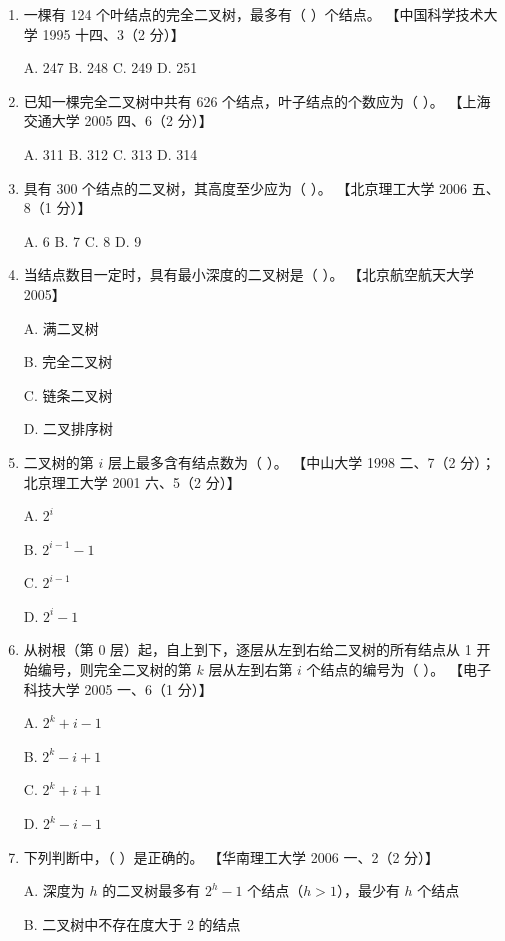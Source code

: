 \documentclass[lang=cn,newtx,10pt,scheme=chinese]{elegantbook}
\begin{document}
\begin{enumerate}
    \item 一棵有 124 个叶结点的完全二叉树，最多有（ ）个结点。  
    【中国科学技术大学 1995 十四、3（2 分）】  

    A. 247 \quad B. 248 \quad C. 249 \quad D. 251  

    \item 已知一棵完全二叉树中共有 626 个结点，叶子结点的个数应为（ ）。  
    【上海交通大学 2005 四、6（2 分）】  

    A. 311 \quad B. 312 \quad C. 313 \quad D. 314  

    \item 具有 300 个结点的二叉树，其高度至少应为（ ）。  
    【北京理工大学 2006 五、8（1 分）】  

    A. 6 \quad B. 7 \quad C. 8 \quad D. 9  

    \item 当结点数目一定时，具有最小深度的二叉树是（ ）。  
    【北京航空航天大学 2005】  

    A. 满二叉树  

    B. 完全二叉树  

    C. 链条二叉树  

    D. 二叉排序树  

    \item 二叉树的第 $i$ 层上最多含有结点数为（ ）。  
    【中山大学 1998 二、7（2 分）；北京理工大学 2001 六、5（2 分）】  

    A. $2^i$  


    B. $2^{i-1} - 1$  

    C. $2^{i-1}$  

    D. $2^{i} - 1$  

    \item 从树根（第 0 层）起，自上到下，逐层从左到右给二叉树的所有结点从 1 开始编号，则完全二叉树的第 $k$ 层从左到右第 $i$ 个结点的编号为（ ）。  
    【电子科技大学 2005 一、6（1 分）】  

    A. $2^k + i - 1$  

    B. $2^{k} - i + 1$  

    C. $2^k + i + 1$  

    D. $2^{k} - i - 1$  

    \item 下列判断中，（ ）是正确的。  
    【华南理工大学 2006 一、2（2 分）】  

    A. 深度为 $h$ 的二叉树最多有 $2^h - 1$ 个结点（$h > 1$），最少有 $h$ 个结点  

    B. 二叉树中不存在度大于 2 的结点  


\end{enumerate}
\end{document}
